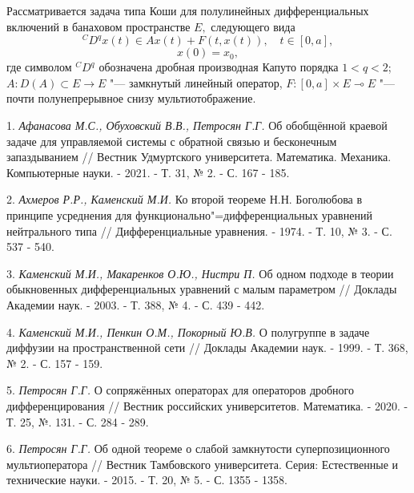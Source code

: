 
\vzmscaption

Рассматривается задача типа Коши для полулинейных дифференциальных включений в банаховом пространстве $E,$ следующего вида
$$
 ^CD^q x\left( t\right)\in Ax(t)+F(t,x(t)),\quad t \in \left[0,a\right],
$$
$$
x(0)=x_0,
$$
где символом $^{C}D^{q}$ обозначена дробная производная Капуто порядка $1<q<2$; $A:D(A)\subset E \rightarrow E$ "--- замкнутый линейный оператор, $F: [0,a] \times E \multimap E$ "--- почти полунепрерывное снизу мультиотображение.


\litlist

1. {\it Афанасова М.С., Обуховский В.В., Петросян Г.Г.} Об обобщённой краевой задаче для управляемой системы с обратной связью и бесконечным запаздыванием // Вестник Удмуртского университета. Математика. Механика. Компьютерные науки. - 2021. - Т. 31, № 2. - С. 167 - 185.

2. {\it Ахмеров Р.Р., Каменский М.И.} Ко второй теореме Н.Н. Боголюбова в принципе усреднения для функционально"=дифференциальных уравнений нейтрального типа // Дифференциальные уравнения. - 1974. - Т. 10, № 3. - С. 537 - 540.

3. {\it Каменский М.И., Макаренков О.Ю., Нистри П.} Об одном подходе в теории обыкновенных дифференциальных уравнений с малым параметром // Доклады Академии наук. - 2003. - Т. 388, № 4. - С. 439 - 442.

4. {\it Каменский М.И., Пенкин О.М., Покорный Ю.В.} О полугруппе в задаче диффузии на пространственной сети // Доклады Академии наук. - 1999. - Т. 368, № 2. - С. 157 - 159.

5.	{\it Петросян Г.Г.} О сопряжённых операторах для операторов дробного дифференцирования // Вестник российских университетов. Математика. - 2020. - Т. 25, №. 131. - С. 284 - 289.

6. {\it Петросян Г.Г.} Об одной теореме о слабой замкнутости суперпозиционного мультиоператора // Вестник Тамбовского университета. Серия: Естественные и технические науки. - 2015. - Т. 20, № 5. - С. 1355 - 1358.

